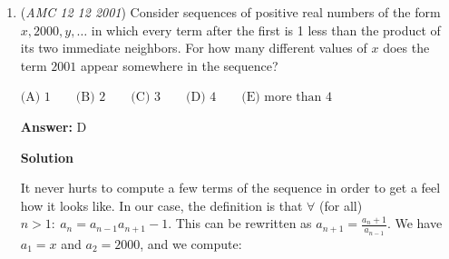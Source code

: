 \begin{enumerate}
 Therefore $2 \theta = 150^\circ$, $\angle ACB = \boxed{\textbf{(D) } 75^\circ }$




\textbf{Solution 6}

For starters, we have $\angle ABD=120^\circ.$ Dropping perpendiculars $\overline{DX}$ and $\overline{CY}$ from $D$ and $C$ to $\overline{AB}$ gives $\angle ADX=120^\circ-45^\circ=75^\circ,$ since $\angle BDX=45^\circ.$

 Without loss of generality, let $BD=1$ and $CD=2.$ This tells us that $BX=DX=\sqrt{2}/2.$ Using trigonometric identities, we find that

 
 \[\tan \angle ADX=\tan 75^\circ=\dfrac{\sqrt 6+\sqrt 2}{\sqrt 6-\sqrt 2}.\]Thus, $AX/DX=\dfrac{\sqrt 6+\sqrt 2}{\sqrt 6-\sqrt 2},$ which gives $AX=\dfrac{2\sqrt 2+\sqrt 6}{2}.$ Thus, $AB=AX+BX=\dfrac{3\sqrt 2+\sqrt 6}{2}.$

 Now, note that $BCY$ is a $45-45-90$ triangle, so $CY=BY=\dfrac{3\sqrt 2}{2}.$ Thus, we have

 
 \[[ABC]=\dfrac{1}{2}\cdot AB\cdot CY=\dfrac{1}{2}\cdot \dfrac{3\sqrt 2+\sqrt 6}{2}\cdot \dfrac{3\sqrt 2}{2}=\dfrac{9+3\sqrt 3}{4}.\]Additionally, note that $AY=AB-BY=\sqrt{6}/2.$ Applying the Pythagorean Theorem to triangle $AYC$ then tells us that $AC=\sqrt{6}.$ By the trigonometric formula for area,

 
 \[[ABC]=\dfrac{1}{2}\cdot BC\cdot AC\cdot \sin \angle ACB=\dfrac{3\sqrt 6}{2}\sin \angle ACB.\]Setting this equal to our other area and solving gives $\sin \angle ACB=\dfrac{\sqrt 6+\sqrt 2}{4},$ so $\angle ACB=\boxed{75^\circ}.$ ~vaporwave

 


	\item (\textit{AMC 12 12 2001}) Consider sequences of positive real numbers of the form $x, 2000, y, \dots$ in which every term after the first is 1 less than the product of its two immediate neighbors. For how many different values of $x$ does the term $2001$ appear somewhere in the sequence?


 $\text{(A) }1 \qquad \text{(B) }2 \qquad \text{(C) }3 \qquad \text{(D) }4 \qquad \text{(E) more than }4$

 \textbf{Answer: }D



\textbf{Solution}

It never hurts to compute a few terms of the sequence in order to get a feel how it looks like. In our case, the definition is that $\forall$ (for all) $n>1:~ a_n = a_{n-1}a_{n+1} - 1$. This can be rewritten as $a_{n+1} = \frac{a_n +1}{a_{n-1}}$. We have $a_1=x$ and $a_2=2000$, and we compute:


\end{enumerate}
